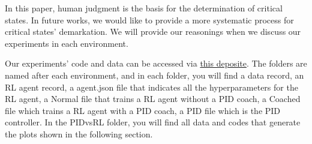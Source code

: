 In this paper, human judgment is the basis for the determination of critical states. In future works, we would like to provide a more systematic process for critical states' demarkation. We will provide our reasonings when we discuss our experiments in each environment. 

Our experiments' code and data can be accessed via \href{https://github.com/BaiLiping/Coaching}{this deposite}. The folders are named after each environment, and in each folder, you will find a data record, an RL agent record, a agent.json file that indicates all the hyperparameters for the RL agent, a Normal file that trains a RL agent without a PID coach, a Coached file which trains a RL agent with a PID coach, a PID file which is the PID controller. In the PIDvsRL folder, you will find all data and codes that generate the plots shown in the following section.

